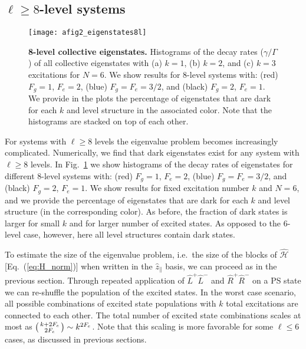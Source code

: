 \documentclass[aps,prx,superscriptaddress,twocolumn,notitlepage,nofootinbib,longbibliography]{revtex4-2}
\newcommand{\quv}{\hat{z}}
\begin{document}

\subsection{\texorpdfstring{$\ell\geq8$}{l>=8}-level systems}

\begin{figure}[!t]
\centering
\texttt{[image: afig2\_eigenstates8l]}
\caption{\textbf{8-level collective eigenstates.} Histograms of the decay rates ($\gamma/\Gamma$) of all collective eigenstates with (a) $k=1$, (b) $k=2$, and (c) $k=3$ excitations for $N=6$. We show results for 8-level systems with: (red) $F_g=1$, $F_e=2$, (blue) $F_g=F_e=3/2$, and (black) $F_g=2$, $F_e=1$. We provide in the plots the percentage of eigenstates that are dark for each $k$ and level structure in the associated color. Note that the histograms are stacked on top of each other.}
\label{fig:app_eigenstates8l}
\end{figure}


For systems with $\ell\geq8$ levels the eigenvalue problem becomes increasingly complicated. Numerically, we find that dark eigenstates exist for any system with $\ell\geq8$ levels. In Fig.~\ref{fig:app_eigenstates8l} we show histograms of the decay rates of eigenstates for different 8-level systems with: (red) $F_g=1$, $F_e=2$, (blue) $F_g=F_e=3/2$, and (black) $F_g=2$, $F_e=1$. We show results for fixed excitation number $k$ and $N=6$, and we provide the percentage of eigenstates that are dark for each $k$ and level structure (in the corresponding color). As before, the fraction of dark states is larger for small $k$ and for larger number of excited states. As opposed to the 6-level case, however, here all level structures contain dark states.

To estimate the size of the eigenvalue problem, i.e.~the size of the blocks of $\hat{\mathcal{H}}$ [Eq.~(\ref{eq:H_norm})] when written in the $\quv_\parallel$ basis, we can proceed as in the previous section. Through repeated application of $\hat{L}^+\hat{L}^-$ and $\hat{R}^+\hat{R}^-$ on a PS state we can re-shuffle the population of the excited states. In the worst case scenario, all possible combinations of excited state populations with $k$ total excitations are connected to each other. The total number of excited state combinations scales at most as $\begin{psmallmatrix} k+2F_e \\ 2F_e \end{psmallmatrix}\sim k^{2F_e}$. Note that this scaling is more favorable for some $\ell\leq6$ cases, as discussed in previous sections.
\end{document}

